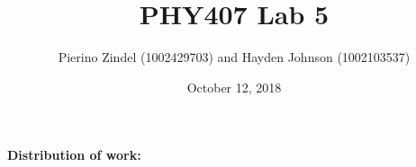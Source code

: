 \documentclass{article}
\title{PHY407 Lab 5}
\author{Pierino Zindel (1002429703) and Hayden Johnson (1002103537)}
\date{October 12, 2018}
\begin{document}
\maketitle

\noindent \textbf{Distribution of work:}
\end{document}
